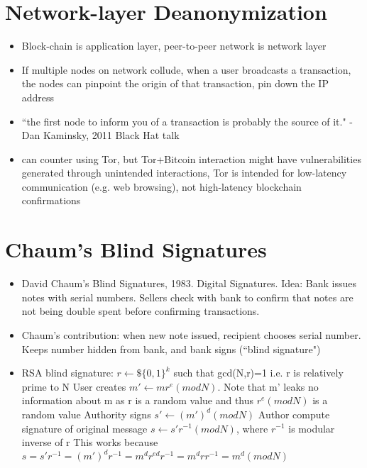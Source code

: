 \documentclass{article}
\begin{document}
\section{Network-layer Deanonymization}
\begin{itemize}
\item Block-chain is application layer, peer-to-peer network is network layer
\item If multiple nodes on network collude, when a user broadcasts a transaction, the nodes can pinpoint the origin of that transaction, pin down the IP address
\item ``the first node to inform you of a transaction is probably the source of it." - Dan Kaminsky, 2011 Black Hat talk
\item can counter using Tor, but Tor+Bitcoin interaction might have vulnerabilities generated through unintended interactions, Tor is intended for low-latency communication (e.g. web browsing), not high-latency blockchain confirmations
\end{itemize}

\section{Chaum's Blind Signatures}
\begin{itemize}
\item David Chaum's Blind Signatures, 1983. Digital Signatures. Idea: Bank issues notes with serial numbers. Sellers check with bank to confirm that notes are not being double spent before confirming transactions.
\item Chaum's contribution: when new note issued, recipient chooses serial number. Keeps number hidden from bank, and bank signs (``blind signature")
\item RSA blind signature:
\subitem $r \leftarrow{\$} \{0,1\}^k$ such that gcd(N,r)=1 i.e. r is relatively prime to N
\subitem User creates $m' \leftarrow mr^e (mod N)$. Note that m' leaks no information about m as r is a random value and thus $r^e (mod N)$ is a random value
\subitem Authority signs $s' \leftarrow (m')^d (mod N)$
\subitem Author compute signature of original message $s \leftarrow s' r^{-1} (mod N)$, where $r^{-1}$ is modular inverse of r
\subitem This works because $s = s' r^{-1} = (m')^d r^{-1} = m^d r^{ed} r^{-1} = m^d r r^{-1} = m^d (mod N)$
\end{itemize}
\end{document}
